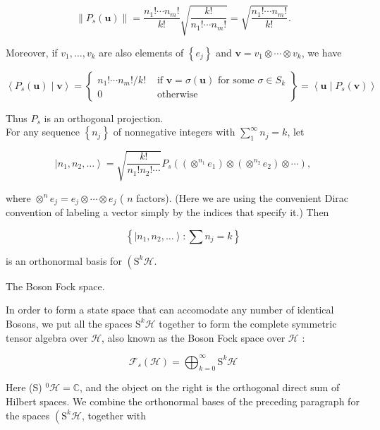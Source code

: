 \documentclass[10pt, letterpaper]{article}
\begin{document}
$$
\left\|P_{s}(\mathbf{u})\right\|=\frac{n_{1}!\cdots n_{m}!}{k!} \sqrt{\frac{k!}{n_{1}!\cdots n_{m}!}}=\sqrt{\frac{n_{1}!\cdots n_{m}!}{k!}} .
$$

Moreover, if $v_{1}, \ldots, v_{k}$ are also elements of $\left\{e_{j}\right\}$ and $\mathbf{v}=v_{1} \otimes \cdots \otimes v_{k}$, we have

$$
\left\langle P_{s}(\mathbf{u}) \mid \mathbf{v}\right\rangle=\left\{\begin{array}{ll}
n_{1}!\cdots n_{m}!/ k! & \text { if } \mathbf{v}=\sigma(\mathbf{u}) \text { for some } \sigma \in S_{k} \\
0 & \text { otherwise }
\end{array}\right\}=\left\langle\mathbf{u} \mid P_{s}(\mathbf{v})\right\rangle
$$

Thus $P_{s}$ is an orthogonal projection.\\
For any sequence $\left\{n_{j}\right\}$ of nonnegative integers with $\sum_{1}^{\infty} n_{j}=k$, let

$$
\left|n_{1}, n_{2}, \ldots\right\rangle=\sqrt{\frac{k!}{n_{1}!n_{2}!\cdots}} P_{s}\left(\left(\otimes^{n_{1}} e_{1}\right) \otimes\left(\otimes^{n_{2}} e_{2}\right) \otimes \cdots\right),
$$

where $\otimes^{n} e_{j}=e_{j} \otimes \cdots \otimes e_{j}$ ( $n$ factors). (Here we are using the convenient Dirac convention of labeling a vector simply by the indices that specify it.) Then

$$
\left\{\left|n_{1}, n_{2}, \ldots\right\rangle: \sum n_{j}=k\right\}
$$

is an orthonormal basis for $\left(\mathrm{S}^{k} \mathcal{H}\right.$.

\pagebreak

The Boson Fock space. 

In order to form a state space that can accomodate any number of identical Bosons, we put all the spaces $\mathrm{S}^{k} \mathcal{H}$ together to form the complete symmetric tensor algebra over $\mathcal{H}$, also known as the Boson Fock space over $\mathcal{H}$ :

$$
\mathcal{F}_{s}(\mathcal{H})=\bigoplus_{k=0}^{\infty} \mathrm{S}^{k} \mathcal{H}
$$

Here (S) ${ }^{0} \mathcal{H}=\mathbb{C}$, and the object on the right is the orthogonal direct sum of Hilbert spaces. We combine the orthonormal bases of the preceding paragraph for the spaces $\left(\mathrm{S}^{k} \mathcal{H}\right.$, together with
\end{document}
